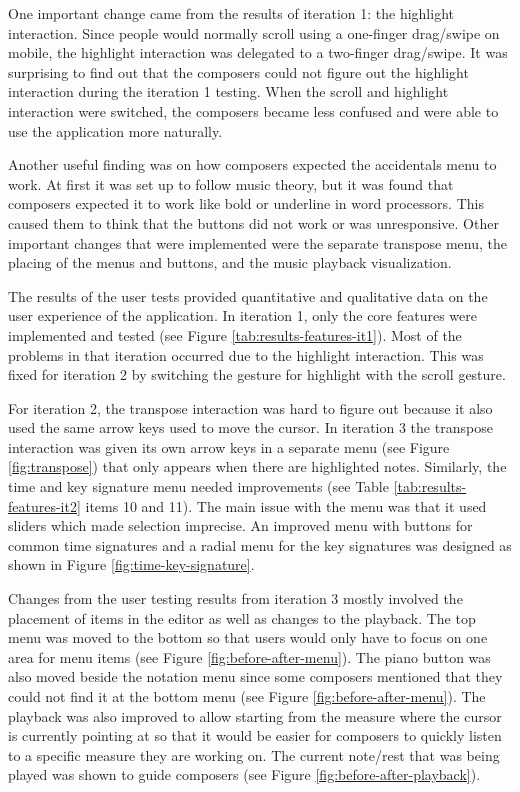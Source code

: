 		One important change came from the results of iteration 1: the highlight interaction. Since people would normally scroll using a one-finger drag/swipe on mobile, the highlight interaction was delegated to a two-finger drag/swipe. It was surprising to find out that the composers could not figure out the highlight interaction during the iteration 1 testing. When the scroll and highlight interaction were switched, the composers became less confused and were able to use the application more naturally. 

		Another useful finding was on how composers expected the accidentals menu to work. At first it was set up to follow music theory, but it was found that composers expected it to work like bold or underline in word processors. This caused them to think that the buttons did not work or was unresponsive. Other important changes that were implemented were the separate transpose menu, the placing of the menus and buttons, and the music playback visualization. 

		The results of the user tests provided quantitative and qualitative data on the user experience of the application. In iteration 1, only the core features were implemented and tested (see Figure \ref{tab:results-features-it1}). Most of the problems in that iteration occurred due to the highlight interaction. This was fixed for iteration 2 by switching the gesture for highlight with the scroll gesture. 

		For iteration 2, the transpose interaction was hard to figure out because it also used the same arrow keys used to move the cursor. In iteration 3 the transpose interaction was given its own arrow keys in a separate menu (see Figure \ref{fig:transpose}) that only appears when there are highlighted notes. Similarly, the time and key signature menu needed improvements (see Table \ref{tab:results-features-it2} items 10 and 11). The main issue with the menu was that it used sliders which made selection imprecise. An improved menu with buttons for common time signatures and a radial menu for the key signatures was designed as shown in Figure \ref{fig:time-key-signature}.

		Changes from the user testing results from iteration 3 mostly involved the placement of items in the editor as well as changes to the playback. The top menu was moved to the bottom so that users would only have to focus on one area for menu items (see Figure \ref{fig:before-after-menu}). The piano button was also moved beside the notation menu since some composers mentioned that they could not find it at the bottom menu (see Figure \ref{fig:before-after-menu}). The playback was also improved to allow starting from the measure where the cursor is currently pointing at so that it would be easier for composers to quickly listen to a specific measure they are working on. The current note/rest that was being played was shown to guide composers (see Figure \ref{fig:before-after-playback}).

